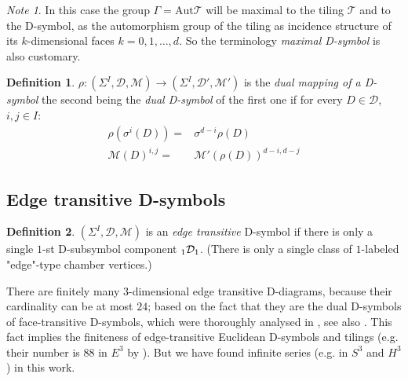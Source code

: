 \documentclass[12pt,a4paper]{article}
\numberwithin{equation}{section}
\newcommand{\leftsub}[2]{{\vphantom{#2}}_{#1}{#2}}
\theoremstyle{plain}%
\newtheorem{prop}[thm]{Proposition}
\theoremstyle{definition}
\newtheorem{defn}{Definition}[section]
\theoremstyle{remark}
\newtheorem*{note}{Note}
\begin{document}
\begin{note}
  In this case the group $\Gamma=\mathrm{Aut}\mathcal{T}$ will be maximal to the tiling
  $\mathcal{T}$ and to the D-symbol, as the automorphism group of the tiling as
  incidence structure of its $k$-dimensional faces $k=0,1,\ldots,d$. So the
  terminology {\em maximal D-symbol} is also customary.
\end{note}

\begin{defn}
  $\rho: (\Sigma^I,\mathcal{D},\mathcal{M}) \rightarrow
  (\Sigma^I,\mathcal{D}',\mathcal{M}')$ is the {\em dual mapping of a D-symbol}
  the second being the {\em dual D-symbol} of the first one if for every $D\in \mathcal{D}$, $i,j
  \in I$:
  \begin{align}
    \rho(\sigma^i(D))= & \sigma^{d-i}\rho(D) \\
    \mathcal{M}(D)^{i,j}= & \mathcal{M}'(\rho(D))^{d-i,d-j}
  \end{align}
\end{defn}


\subsection{Edge transitive D-symbols}
\label{sec:edge_transitive}

\begin{defn}
  $(\Sigma^I,\mathcal{D},\mathcal{M})$ is an {\em edge transitive} D-symbol if
  there is only a single $1$-st D-subsymbol component $\leftsub{1}{\mathcal{D}}_1$. (There is only a single class of
  $1$-labeled "edge"-type chamber vertices.)
\end{defn}

There are finitely many $3$-dimensional edge transitive D-diagrams, because their
cardinality can be at most $24$; based on the fact that they are the dual
D-symbols of face-transitive D-symbols, which were thoroughly analysed in
\cite{DHM93}, see also \cite{DDH98}. This fact implies the finiteness of edge-transitive
Euclidean D-symbols and tilings (e.g. their number is $88$ in $E^3$ by
\cite{DHM93}). But we have found infinite series (e.g. in $S^3$ and $H^3$) in this work.
\end{document}
